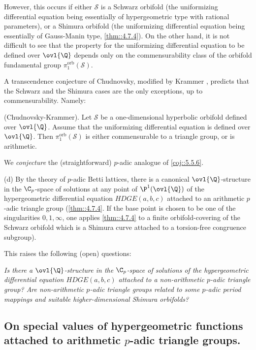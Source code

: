 \begin{rems}
 However, this occurs if either ${\mathcal{S}}$ is a Schwarz orbifold
 (the uniformizing differential equation being essentially of
 hypergeometric type with rational parameters), or a Shimura orbifold
 (the uniformizing differential equation being essentially of Gauss-Manin
 type, \cf \ref{thm::4.7.4}). On the other hand, it is not difficult to
 see that the 
 property for the uniformizing differential equation to be defined over
 $\ovl{\Q}$ depends only on the commensurability class of the orbifold
 fundamental group $\pi_1^{\mathrm{orb}}(\mathcal{S})$.

 A transcendence conjecture of Chudnovsky, modified by Krammer 
 \cite[12]{aeoaafg}, predicts that the Schwarz and the Shimura 
 cases are the only exceptions, up to commensurability. Namely: 
 
 \begin{coj}\label{coj::5.5.6} (Chudnovsky-Krammer). Let ${\mathcal{S} }$
  be a one-dimensional hyperbolic orbifold defined over
  $\ovl{\Q}$. Assume that the uniformizing differential equation is
  defined over $\ovl{\Q}$. Then $\pi_1^{\mathrm{orb}}(\mathcal{S})$ is either
  commensurable to a triangle group, or is arithmetic.
 \end{coj}

 We {\it conjecture} the (straightforward) $p$-adic analogue of
 \ref{coj::5.5.6}.
 
 \medskip
 (d) By the theory of $p$-adic Betti lattices, there is
 a canonical $\ovl{\Q}$-structure in the $\C_p$-space of solutions at
 any point of $\P^1(\ovl{\Q})$ of the hypergeometric differential
 equation $HDGE(a,b,c)$ attached to an arithmetic $p$-adic triangle group
 (\cf \ref{thm::4.7.4}. If the base point is chosen to be one of the
 singularities $0,1,\infty$, one applies \ref{thm::4.7.4}
 to a finite orbifold-covering of the Schwarz orbifold which is a
 Shimura curve attached to a torsion-free congruence subgroup). 
 
 This raises the following (open) questions:

 {\it Is there a $\ovl{\Q}$-structure in the $\C_p$-space
 of solutions of the hypergeometric differential equation $HDGE(a,b,c)$
 attached to a non-arithmetic $p$-adic triangle group? Are
 non-arithmetic $p$-adic triangle groups related to some $p$-adic period
 mappings and suitable higher-dimensional Shimura orbifolds?}
\end{rems} 


\subsection{On special values of hypergeometric functions attached to 
arithmetic $p$-adic triangle groups.}\label{sub::5.6}  

